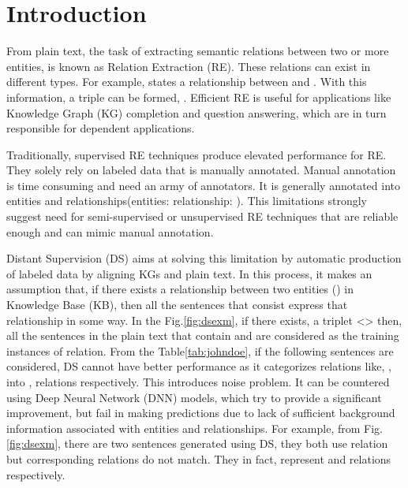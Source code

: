 \chapter{Introduction}
\label{ch:introduction}

\newpar
From plain text, the task of extracting semantic relations between two or more entities, is known as Relation Extraction (RE). These relations can exist in different types. For example,  states a  relationship between  and . With this information, a triple can be formed, . Efficient RE is useful for applications like Knowledge Graph (KG) completion and question answering, which are in turn responsible for dependent applications. 


\newpar
Traditionally, supervised RE techniques produce elevated performance for RE\cite{sarawagi2008information}. They solely rely on labeled data that is manually annotated. Manual annotation is time consuming and need an army of annotators. It is generally annotated into entities and relationships(entities:  relationship: ). This limitations strongly suggest need for semi-supervised or unsupervised RE techniques that are reliable enough and can mimic manual annotation.  

\newpar
Distant Supervision (DS) aims at solving this limitation by automatic production of labeled data by aligning KGs and plain text. In this process, it makes an assumption that, if there exists a relationship between two entities () in Knowledge Base (KB), then all the sentences that consist  express that relationship in some way\cite{zeng2015distant}. 
In the Fig.\ref{fig:dsexm}, if there exists, a triplet <> then, all the sentences in the plain text that contain  and  are considered as the training instances of  relation. From the Table\ref{tab:johndoe}, if the following sentences are considered, DS cannot have better performance as it categorizes relations like, ,  into ,  relations respectively. This introduces noise problem. It can be countered using Deep Neural Network (DNN) models, which try to provide a significant improvement, but fail in making predictions due to lack of sufficient background information associated with entities and relationships. For example, from Fig.\ref{fig:dsexm}, there are two sentences generated using DS, they both use  relation but corresponding relations do not match. They in fact, represent  and  relations respectively.

